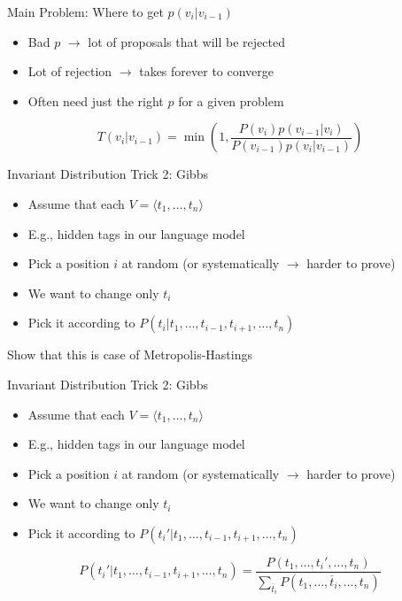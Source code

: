 \documentclass[11pt]{beamer}
\begin{document}
	\begin{frame}{Main Problem: Where to get $p(v_i|v_{i-1})$}
		\begin{itemize}
			\item Bad $p$ $\rightarrow$  lot of proposals that will be rejected
			\item Lot of rejection $\rightarrow$ takes forever to converge
			\item Often need just the right $p$ for a given problem
		\end{itemize}
		
		$$T(v_i|v_{i-1}) = \min\left(1,\frac{P(v_i)p(v_{i-1}|v_i)}{P(v_{i-1})p(v_i|v_{i-1})}\right)$$
	\end{frame}
	
	\begin{frame}{Invariant Distribution Trick 2: Gibbs}
		\begin{itemize}
			\item Assume that each $V = \langle t_1, \dots, t_n \rangle$
			\item E.g., hidden tags in our language model
			\item Pick a position $i$ at random (or systematically $\rightarrow$ harder to prove)
			\item We want to change only $t_i$
			\item Pick it according to $P(t_i|t_1,\dots,t_{i-1},t_{i+1},\dots,t_n)$
		\end{itemize}
		
		\vspace{10pt}Show that this is case of Metropolis-Hastings
	\end{frame}
	
	\begin{frame}{Invariant Distribution Trick 2: Gibbs}
		\begin{itemize} 
			\item Assume that each $V = \langle t_1, \dots, t_n \rangle$
			\item E.g., hidden tags in our language model 
			\item Pick a position $i$ at random (or systematically $\rightarrow$ harder to prove)
			\item We want to change only $t_i$
			\item Pick it according to $P(t_{i}'|t_1,\dots,t_{i-1},t_{i+1},\dots,t_n)$
		\end{itemize}
		
		$$P(t_{i}'|t_1,\dots,t_{i-1},t_{i+1},\dots,t_n) = \frac{P(t_1,\dots,t_{i}',\dots,t_n)}{\sum_{\overline{t}_i} P(t_1,\dots,\overline{t}_{i},\dots,t_n)}$$
	\end{frame}
	
\end{document}
